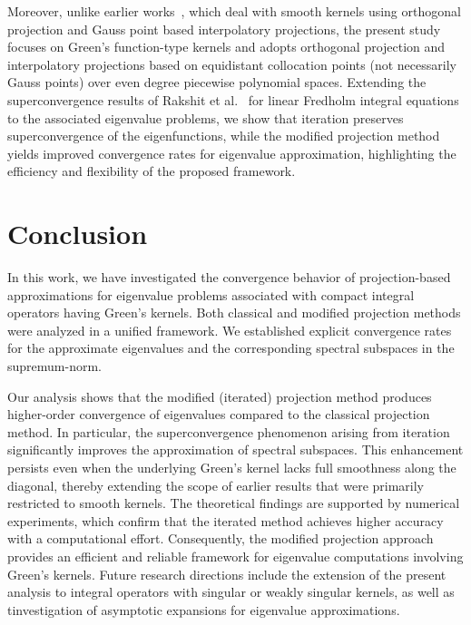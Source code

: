 \documentclass[pdflatex, sn-mathphys-num]{sn-jnl}%
\theoremstyle{thmstyleone}%
\theoremstyle{thmstyletwo}%
\theoremstyle{thmstylethree}%
\begin{document}
Moreover, unlike earlier works~\cite{RPK5,RPK6}, which deal with smooth kernels using orthogonal projection and Gauss point based interpolatory projections, the present study focuses on Green’s function-type kernels and adopts orthogonal projection and interpolatory projections based on equidistant collocation points (not necessarily Gauss points) over even degree piecewise polynomial spaces. Extending the superconvergence results of Rakshit et al.~\cite{GR-SKS-ASR} for linear Fredholm integral equations to the associated eigenvalue problems, we show that iteration preserves superconvergence of the eigenfunctions, while the modified projection method yields improved convergence rates for eigenvalue approximation, highlighting the efficiency and flexibility of the proposed framework.








\section{Conclusion}
In this work, we have investigated the convergence behavior of projection-based approximations for eigenvalue problems associated with compact integral operators having Green's kernels. Both classical and modified projection methods were analyzed in a unified framework. We established explicit convergence rates for the approximate eigenvalues and the corresponding spectral subspaces in the supremum-norm.

Our analysis shows that the modified (iterated) projection method produces higher-order convergence of eigenvalues compared to the classical projection method. In particular, the superconvergence phenomenon arising from iteration significantly improves the approximation of spectral subspaces. This enhancement persists even when the underlying Green's kernel lacks full smoothness along the diagonal, thereby extending the scope of earlier results that were primarily restricted to smooth kernels. The theoretical findings are supported by numerical experiments, which confirm that the iterated method achieves higher accuracy with a computational effort. Consequently, the modified projection approach provides an efficient and reliable framework for eigenvalue computations involving Green's kernels. Future research directions include the extension of the present analysis to integral operators with singular or weakly singular kernels, as well as tinvestigation of asymptotic expansions for eigenvalue approximations.
\end{document}
